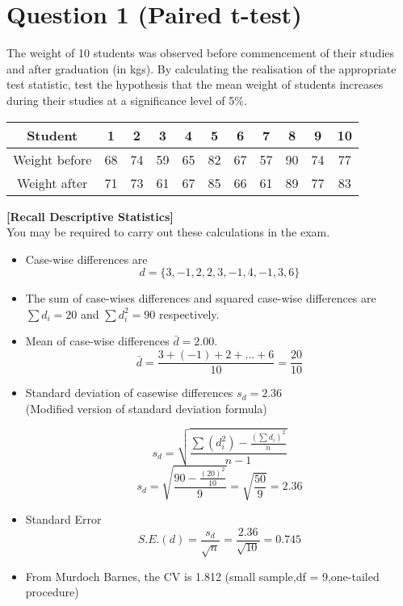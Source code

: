 \documentclass[a4paper,12pt]{article}
\begin{document}
\newpage
{}
\section*{Question 1 (Paired t-test)}
The weight of 10 students was observed before commencement of their studies and after graduation (in kgs). By calculating the realisation of the appropriate test statistic, test the hypothesis that the mean weight of students increases during their studies at a significance level of  5\%. 
\begin{center}
\begin{tabular}{|c|c|c|c|c|c|c|c|c|c|c|}
\hline
Student	&	1	&	2	&	3	&	4	&	5	&	6	&	7	&	8	&	9	&	10	\\ \hline
Weight before	&	68	&	74	&	59	&	65	&	82	&	67	&	57	&	90	&	74	&	77	\\ \hline
Weight after	&	71	&	73	&	61	&	67	&	85	&	66	&	61	&	89	&	77	&	83	\\ \hline
\end{tabular} 
\end{center}

\noindent \textbf{[Recall Descriptive Statistics]}\\
\noindent You may be required to carry out these calculations in the exam.
\begin{itemize}
\item Case-wise differences are 
\[ d = \{3, -1,  2,  2,  3, -1,  4, -1,  3,  6  \}\]
\item The sum of case-wises differences and squared case-wise differences are $\sum d_i = 20$ and $\sum d_i^2 = 90$ respectively.
\item Mean of case-wise differences $\bar{d}=2.00$.
\[ \bar{d} = \frac{3 + (-1) + 2 + \ldots + 6}{10} = \frac{20}{10} \]
\item Standard deviation of casewise differences $s_d= 2.36 $\\
(Modified version of standard deviation formula)


\[ s_d = \sqrt{\frac{ \sum(d^2_i) - \frac{(\sum d_i)^2}{n}}{n-1}}\]
\[ s_d = \sqrt{\frac{ 90 - \frac{(20)^2}{10}}{9}} = \sqrt{\frac{50}{9}} = 2.36 \]

\item Standard Error
\[ S.E.(d) = \frac{s_d}{\sqrt{n}} =\frac{2.36}{\sqrt{10}} = 0.745\]
\item From Murdoch Barnes, the CV is 1.812 (small sample,df = 9,one-tailed procedure)
\end{itemize}
\end{document}
